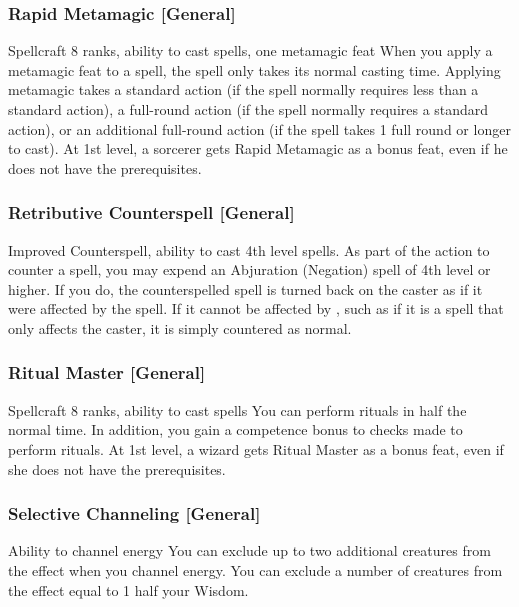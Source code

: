 \subsubsection{Rapid Metamagic [General]}
 Spellcraft 8 ranks, ability to cast spells, one metamagic feat
 When you apply a metamagic feat to a spell, the spell only takes its normal casting time.
 Applying metamagic takes a standard action (if the spell normally requires less than a standard action), a full-round action (if the spell normally requires a standard action), or an additional full-round action (if the spell takes 1 full round or longer to cast).
 At 1st level, a sorcerer gets Rapid Metamagic as a bonus feat, even if he does not have the prerequisites.

\subsubsection{Retributive Counterspell [General]}
 Improved Counterspell, ability to cast 4th level spells.
 As part of the action to counter a spell, you may expend an Abjuration (Negation) spell of 4th level or higher. If you do, the counterspelled spell is turned back on the caster as if it were affected by the  spell. If it cannot be affected by , such as if it is a spell that only affects the caster, it is simply countered as normal.

\subsubsection{Ritual Master [General]}
 Spellcraft 8 ranks, ability to cast spells
 You can perform rituals in half the normal time. In addition, you gain a  competence bonus to checks made to perform rituals.
 At 1st level, a wizard gets Ritual Master as a bonus feat, even if she does not have the prerequisites.

\subsubsection{Selective Channeling [General]}
 Ability to channel energy
 You can exclude up to two additional creatures from the effect when you channel energy.
 You can exclude a number of creatures from the effect equal to 1 \add half your Wisdom.

